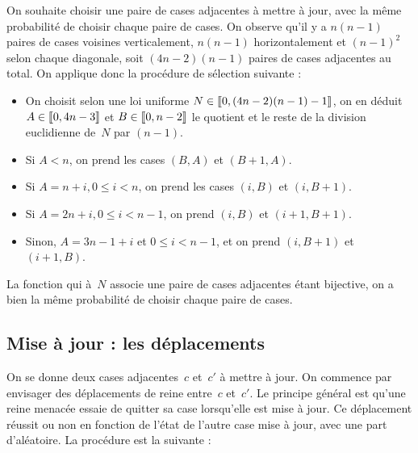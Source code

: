 \documentclass[11pt, openany, a4paper]{article}
\newcommand{\cg }{[\kern-0.15em [}
\newcommand{\cd}{]\kern-0.15em]}
\begin{document}
On souhaite choisir une paire de cases adjacentes à mettre à jour, avec la même probabilité de choisir chaque paire de cases. On observe qu'il y a $n(n-1)$ paires de cases voisines verticalement, $n(n-1)$ horizontalement et $(n-1)^2$ selon chaque diagonale, soit $(4n-2)(n-1)$ paires de cases adjacentes au total. On applique donc la procédure de sélection suivante : \begin{itemize}

\item{On choisit selon une loi uniforme $N \in \cg 0, (4n-2)(n-1) -1 \cd$, on en déduit $A \in \cg 0, 4n-3 \cd$ et $B \in \cg 0, n-2\cd$ le quotient et le reste de la division euclidienne de~$N$ par $(n-1)$.  }
\item{Si $A<n$, on prend les cases $(B,A)$ et $(B+1,A)$.}
\item{Si $A = n+i, 0\leq i<n$, on prend les cases $(i,B)$ et $(i,B+1)$.}
\item{Si $A = 2n+i,0 \leq i<n-1$, on prend $(i,B)$ et $(i+1, B+1)$.}
\item{Sinon, $A = 3n-1+i$ et $0 \leq i<n-1$, et on prend $(i, B+1)$ et $(i+1, B)$.}



\end{itemize}
La fonction qui à~$N$ associe une paire de cases adjacentes étant bijective, on a bien la même probabilité de choisir chaque paire de cases. 


\subsection{Mise à jour : les déplacements}

On se donne deux cases adjacentes~$c$ et~$c'$ à mettre à jour. On commence par envisager des déplacements de reine entre~$c$ et~$c'$. Le principe général est qu'une reine menacée essaie de quitter sa case lorsqu'elle est mise à jour. Ce déplacement réussit ou non en fonction de l'état de l'autre case mise à jour, avec une part d'aléatoire. La procédure est la suivante :
\end{document}
